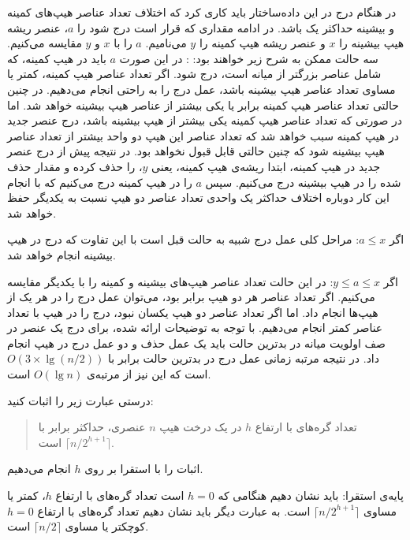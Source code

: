 در هنگام درج در این داده‌ساختار باید کاری کرد که اختلاف تعداد عناصر هیپ‌های کمینه و بیشینه حداکثر یک باشد. در ادامه مقداری که قرار است درج شود را {$a$}، عنصر ریشه هیپ بیشینه را {$x$} و عنصر ریشه هیپ کمینه را {$y$} می‌نامیم. {$a$} را با {$x$} و {$y$} مقایسه می‌کنیم. سه حالت ممکن به شرح زیر خواهند بود:
: در این صورت {$a$} باید در هیپ کمینه، که شامل عناصر بزرگتر از میانه است، درج شود. اگر تعداد عناصر  هیپ کمینه، کمتر یا مساوی تعداد عناصر هیپ بیشینه باشد، عمل درج را به راحتی انجام می‌دهیم. در چنین حالتی تعداد عناصر هیپ کمینه برابر یا یکی بیشتر از عناصر هیپ بیشینه خواهد شد. اما در صورتی‌ که تعداد عناصر هیپ کمینه یکی بیشتر از هیپ بیشینه باشد، درج عنصر جدید در هیپ کمینه سبب خواهد شد که تعداد عناصر این هیپ دو واحد بیشتر از تعداد عناصر هیپ بیشینه شود که چنین حالتی قابل قبول نخواهد بود. در نتیجه پیش از درج عنصر جدید در هیپ کمینه، ابتدا ریشه‌ی هیپ کمینه، یعنی {$y$}، را حذف کرده و مقدار حذف شده را در هیپ بیشینه درج می‌کنیم. سپس {$a$} را در هیپ کمینه درج می‌کنیم که با انجام این کار دوباره اختلاف حداکثر یک واحدی تعداد عناصر دو هیپ نسبت به یکدیگر حفظ خواهد شد.

 اگر {$a \leq x$}: مراحل کلی عمل درج شبیه به حالت قبل است با این تفاوت که درج در هیپ بیشینه انجام خواهد شد.

 اگر {$y \leq a \leq x$}: در این حالت تعداد عناصر هیپ‌های بیشینه و کمینه را با یکدیگر مقایسه می‌کنیم. اگر تعداد عناصر هر دو هیپ برابر بود، می‌توان عمل درج را در هر یک از هیپ‌ها انجام داد. اما اگر تعداد عناصر دو هیپ یکسان نبود، درج را در هیپ با تعداد عناصر کمتر انجام می‌دهیم.
با توجه به توضیحات ارائه ‌شده، برای درج یک عنصر در صف اولویت میانه در بدترین حالت باید یک عمل حذف و دو عمل درج در هیپ انجام داد. در نتیجه مرتبه زمانی عمل درج در بدترین حالت برابر با {$O(3\times \lg (n/2))$} است که این نیز از مرتبه‌ی {$O(\lg n)$} است.

 درستی عبارت زیر را اثبات کنید:
\begin{quote}
تعداد گره‌های با ارتفاع {$h$} در یک درخت هیپ {$n$} عنصری، حداکثر برابر با {$\lceil n/2^{h+1}\rceil$} است.
\end{quote}


اثبات را با استقرا بر روی {$h$} انجام می‌دهیم.

پایه‌ی استقرا: باید نشان دهیم هنگامی که {$h=0$} است تعداد گره‌های با ارتفاع {$h$}، کمتر یا مساوی {$\lceil n/2^{h+1}\rceil$} است. به عبارت دیگر باید نشان دهیم تعداد گره‌های با ارتفاع {$h=0$} کوچکتر یا مساوی {$\lceil n/2\rceil$} است.


